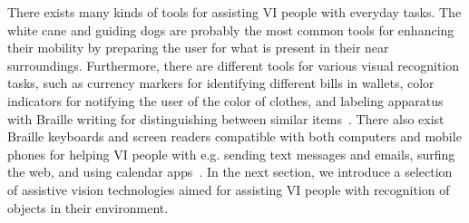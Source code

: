 
There exists many kinds of tools for assisting VI people with everyday tasks. The white cane and guiding dogs are probably the most common tools for enhancing their mobility by preparing the user for what is present in their near surroundings. Furthermore, there are different tools for various visual recognition tasks, such as currency markers for identifying different bills in wallets, color indicators for notifying the user of the color of clothes, and labeling apparatus with Braille writing for distinguishing between similar items~\cite{srf2017vardagstips}. There also exist Braille keyboards and screen readers compatible with both computers and mobile phones for helping VI people with e.g. sending text messages and emails, surfing the web, and using calendar apps~\cite{gotesson2019challenges}. In the next section, we introduce a selection of assistive vision technologies aimed for assisting VI people with recognition of objects in their environment. 
 



